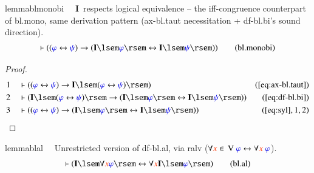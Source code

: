 \begin{restatable}{lemma}{blmonobi}~~ $\mathbf{I}$~respects logical equivalence -- the
iff-congruence counterpart of bl.mono, same derivation pattern
(ax-bl.taut necessitation + df-bl.bi's sound direction).
\begin{align}
\vdash ( ( \mw{\varphi} \leftrightarrow \mw{\psi} ) \rightarrow ( \mathbf{I}
    \lsem \mw{\varphi} \rsem \leftrightarrow \mathbf{I} \lsem \mw{\psi} \rsem
    ) )\label{eq:bl.monobi}\tag{bl.monobi}
\end{align}
\end{restatable}

\begin{proof}
\begin{align}
  1 &&  & \vdash ( ( \mw{\varphi} \leftrightarrow \mw{\psi} ) \rightarrow
      \mathbf{I} \lsem ( \mw{\varphi} \leftrightarrow \mw{\psi} ) \rsem
      )&(\mbox{\ref{eq:ax-bl.taut}})\notag
  \\ 2 &&  & \vdash ( \mathbf{I} \lsem ( \mw{\varphi} \leftrightarrow
      \mw{\psi} ) \rsem \rightarrow ( \mathbf{I} \lsem \mw{\varphi}
      \rsem \leftrightarrow \mathbf{I} \lsem \mw{\psi} \rsem )
      )&(\mbox{\ref{eq:df-bl.bi}})\notag
  \\ 3 &&  & \vdash ( ( \mw{\varphi} \leftrightarrow \mw{\psi} )
      \rightarrow ( \mathbf{I} \lsem \mw{\varphi} \rsem \leftrightarrow
      \mathbf{I} \lsem \mw{\psi} \rsem )
      )&(\mbox{\ref{eq:syl}},1,2)\notag
\end{align}
\end{proof}

\begin{restatable}{lemma}{blal}~~ Unrestricted version of df-bl.al, via ralv
($\forall \msc{x} \in \,\mathrm{V}~\mw{\varphi} \leftrightarrow \forall
\msc{x}~\mw{\varphi}$).
\begin{align}
\vdash ( \mathbf{I} \lsem \forall \msc{x} \mw{\varphi} \rsem \leftrightarrow
    \forall \msc{x} \mathbf{I} \lsem \mw{\varphi} \rsem
    )\label{eq:bl.al}\tag{bl.al}
\end{align}
\end{restatable}

